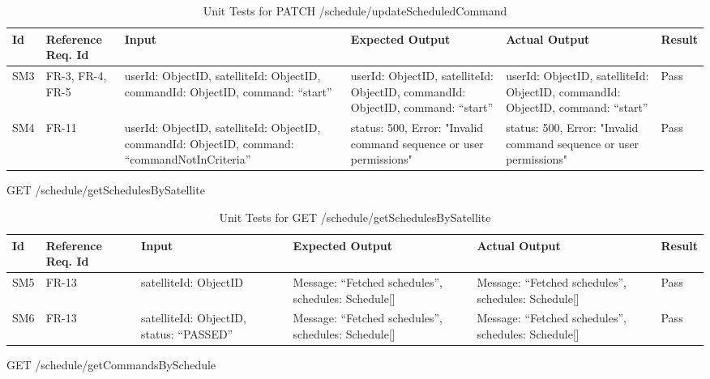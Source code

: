 \documentclass[12pt, titlepage]{article}
\begin{document}
\begin{center}
\begin{longtable}{|p{1cm} | p{2cm} |p{2cm}| p{2cm} |p{2cm}| p{2cm}|}
\caption{Unit Tests for \newline PATCH /schedule/updateScheduledCommand}
\hline
\textbf{Id} & \textbf{Reference Req. Id} & \textbf{Input} & \textbf{Expected Output} & \textbf{Actual Output} & \textbf{Result} \\
\hline
SM3 & FR-3, FR-4, FR-5 & { userId: ObjectID,
satelliteId: ObjectID,
commandId: ObjectID,
command: “start” } & { userId: ObjectID,
satelliteId: ObjectID,
commandId: ObjectID,
command: “start” } & { userId: ObjectID,
satelliteId: ObjectID,
commandId: ObjectID,
command: “start” } & Pass
\\
\hline
SM4 & FR-11 & { userId: ObjectID,
satelliteId: ObjectID,
commandId: ObjectID,
command: “commandNotInCriteria” }
 & { status: 500,
Error: "Invalid command sequence or user permissions" }
 & { status: 500,
Error: "Invalid command sequence or user permissions" }
 & Pass
\\
\hline

\end{longtable}

\end{center}

GET /schedule/getSchedulesBySatellite

\begin{center}
\begin{longtable}{|p{1cm} | p{2cm} |p{2cm}| p{2cm} |p{2cm}| p{2cm}|}
\caption{Unit Tests for \newline GET /schedule/getSchedulesBySatellite}
\hline
\textbf{Id} & \textbf{Reference Req. Id} & \textbf{Input} & \textbf{Expected Output} & \textbf{Actual Output} & \textbf{Result} \\
\hline
SM5 & FR-13 & { satelliteId: ObjectID } & { Message: “Fetched schedules”,
schedules: Schedule[] } & { Message: “Fetched schedules”,
schedules: Schedule[] } & Pass
\\
\hline
SM6 & FR-13 & { satelliteId: ObjectID,
status: “PASSED” } & { Message: “Fetched schedules”,
schedules: Schedule[] } & { Message: “Fetched schedules”,
schedules: Schedule[] } & Pass
\\
\hline

\end{longtable}

\end{center}

GET /schedule/getCommandsBySchedule
\end{document}
